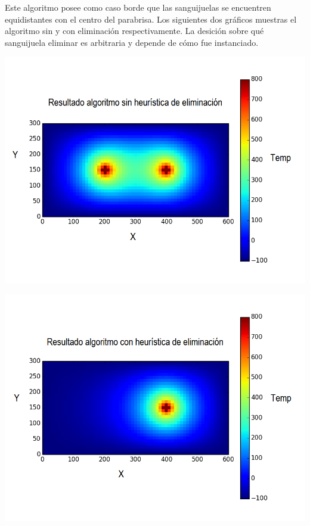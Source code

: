 	Este algoritmo posee como caso borde que las sanguijuelas se encuentren equidistantes con el centro del parabrisa. Los siguientes dos gráficos muestras el algoritmo sin y con eliminación respectivamente. La desición sobre qué sanguijuela eliminar es arbitraria y depende de cómo fue instanciado.

	\begin{center}
		\includegraphics[scale=0.5]{./img/test6_sinkill.png}
	\end{center}

	\begin{center}
		\includegraphics[scale=0.5]{./img/test6_conkill.png}
	\end{center}

